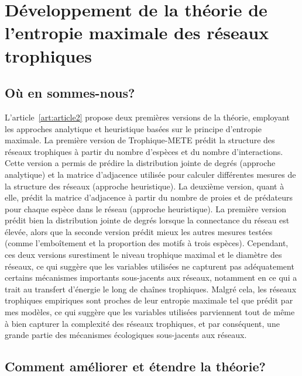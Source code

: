 
\section{Développement de la théorie de l'entropie maximale des réseaux trophiques} 

\subsection{Où en sommes-nous?} 

L'article~\ref{art:article2} propose deux premières versions de la théorie,
employant les approches analytique et heuristique basées sur le principe
d'entropie maximale. La première version de Trophique-METE prédit la structure
des réseaux trophiques à partir du nombre d'espèces et du nombre d'interactions.
Cette version a permis de prédire la distribution jointe de degrés (approche
analytique) et la matrice d'adjacence utilisée pour calculer différentes mesures
de la structure des réseaux (approche heuristique). La deuxième version, quant à
elle, prédit la matrice d'adjacence à partir du nombre de proies et de
prédateurs pour chaque espèce dans le réseau (approche heuristique). La première
version prédit bien la distribution jointe de degrés lorsque la connectance du
réseau est élevée, alors que la seconde version prédit mieux les autres mesures
testées (comme l'emboîtement et la proportion des motifs à trois espèces).
Cependant, ces deux versions surestiment le niveau trophique maximal et le
diamètre des réseaux, ce qui suggère que les variables utilisées ne capturent
pas adéquatement certains mécanismes importants sous-jacents aux réseaux,
notamment en ce qui a trait au transfert d'énergie le long de chaînes
trophiques. Malgré cela, les réseaux trophiques empiriques sont proches de leur
entropie maximale tel que prédit par mes modèles, ce qui suggère que les
variables utilisées parviennent tout de même à bien capturer la complexité des
réseaux trophiques, et par conséquent, une grande partie des mécanismes
écologiques sous-jacents aux réseaux. 

\subsection{Comment améliorer et étendre la théorie?} 


